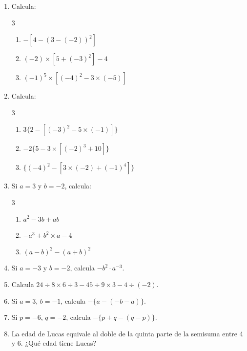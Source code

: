 \documentclass[11pt, letterpaper]{article}
\begin{document}
\begin{enumerate}[label=\textbf{\arabic*.}, leftmargin=*, resume]
  \item Calcula:
  \begin{multicols}{3}
  \begin{enumerate}[label=\alph*)]
    \item $-[4-(3-(-2))^2]$
    \item $(-2)\times[5+(-3)^2]-4$
    \item $(-1)^5\times[(-4)^2-3\times(-5)]$
  \end{enumerate}
  \end{multicols}

  \item Calcula:
  \begin{multicols}{3}
  \begin{enumerate}[label=\alph*)]
    \item $3\{2-[(-3)^2-5\times(-1)]\}$
    \item $-2\{5-3\times[(-2)^3+10]\}$
    \item $\{(-4)^2-[3\times(-2)+(-1)^4]\}$
  \end{enumerate}
  \end{multicols}

  \item Si $a=3$ y $b=-2$, calcula:
  \begin{multicols}{3}
  \begin{enumerate}[label=\alph*)]
    \item $a^2-3b+ab$
    \item $-a^3+b^2\times a-4$
    \item $(a-b)^2-(a+b)^2$
  \end{enumerate}
  \end{multicols}

  \item Si $a=-3$ y $b=-2$, calcula $-b^2\cdot a^{-3}$.

  \item Calcula $24\div 8\times 6\div 3-45\div 9\times 3-4\div(-2)$.

  \item Si $a=3$, $b=-1$, calcula $-\{a-(-b-a)\}$.

  \item Si $p=-6$, $q=-2$, calcula $-\{p+q-(q-p)\}$.

  \item La edad de Lucas equivale al doble de la quinta parte de la semisuma entre 4 y 6. ¿Qu\'e edad tiene Lucas?
\end{enumerate}
\end{document}
